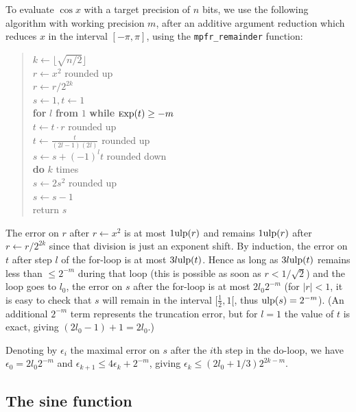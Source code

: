 \documentclass[12pt]{amsart}
\def\q{\hspace*{5mm}}
\def\ulp{{\rm ulp}}
\def\Exp{{\rm \textsc exp}}
\begin{document}
To evaluate $\cos x$ with a target precision of $n$ bits, we use the following
algorithm with working precision $m$, after an additive argument reduction
which reduces $x$ in the interval $[-\pi, \pi]$, using the
\texttt{mpfr\_remainder} function:
\begin{quote}
$k \leftarrow \lfloor \sqrt{n/2} \rfloor$ \\
$r \leftarrow x^2$ rounded up \\ %
$r \leftarrow r/2^{2k}$ \\ %
$s \leftarrow 1, t \leftarrow 1$ \\ %
{\bf for} $l$ {\bf from} $1$ {\bf while} $\Exp(t) \ge -m$ \\
\q $t \leftarrow t \cdot r$ rounded up \\ %
\q $t \leftarrow \frac{t}{(2l-1)(2l)}$ rounded up \\ %
\q $s \leftarrow s + (-1)^l t$ rounded down\\ %
{\bf do} $k$ times \\
\q $s \leftarrow 2 s^2$ rounded up \\
\q $s \leftarrow s - 1$ \\
return $s$ \\
\end{quote}
The error on $r$ after $r \leftarrow x^2$
is at most $1 \ulp(r)$ and remains $1 \ulp(r)$ after
$r \leftarrow r/2^{2k}$ since that division is just an exponent shift.
By induction, the error on $t$ after step $l$ of the for-loop is at most
$3 l \ulp(t)$.
Hence as long as $3 l \ulp(t)$ remains less than $\le 2^{-m}$
during that loop
(this is possible as soon as $r < 1/\sqrt{2}$)
and the loop goes to $l_0$, the error on $s$ after the for-loop is at most
$2 l_0 2^{-m}$ (for $|r| < 1$, it is easy to check that $s$ will remain
in the interval $[\frac{1}{2}, 1[$, thus $\ulp(s) = 2^{-m}$).
(An additional $2^{-m}$ term represents the truncation error,
but for $l=1$ the value of $t$ is exact, giving $(2 l_0 - 1) + 1 = 2 l_0$.)

Denoting by $\epsilon_i$ the maximal error on $s$ after the $i$th step
in the do-loop, we have $\epsilon_0 = 2 l_0 2^{-m}$ and
$\epsilon_{k+1} \le 4 \epsilon_k + 2^{-m}$,
giving $\epsilon_k \le (2 l_0+1/3) 2^{2k-m}$.

\subsection{The sine function}
\end{document}
